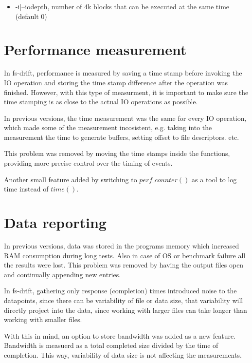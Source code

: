 \documentclass[
  color, %
  table, %
  lof,   %
  lot,   %
]{fithesis3}
\begin{document}
\begin{itemize}
    \item -i|--iodepth, number of 4k blocks that can be executed at the same time (default 0)
\end{itemize}



\section{Performance measurement}
In fs-drift, performance is measured by saving a time stamp before invoking the IO operation and storing the time stamp difference after the operation was finished. However, with this type of measurment, it is important to make sure the time stamping is as close to the actual IO operations as possible. 

In previous versions, the time measurement was the same for every IO operation, which made some of the measurement incosistent, e.g. taking into the measurement the time to generate buffers, setting offset to file descriptors. etc.

This problem was removed by moving the time stamps inside the functions, providing more precise control over the timing of events.

Another small feature added by switching to $perf\_counter()$ as a tool to log time instead of $time()$.


\section{Data reporting}
In previous versions, data was stored in the programs memory which increased RAM consumption during long tests. Also in case of OS or benchmark failure all the results were lost. This problem was removed by having the output files open and continually appending new entries.

In fs-drift, gathering only response (completion) times introduced noise to the datapoints, since there can be variability of file or data size, that variability will directly project into the data, since working with larger files can take longer than working with smaller files.

With this in mind, an option to store bandwidth was added as a new feature. Bandwidth is measuerd as a total completed size divided by the time of completion. This way, variability of data size is not affecting the measurements.

\end{document}

